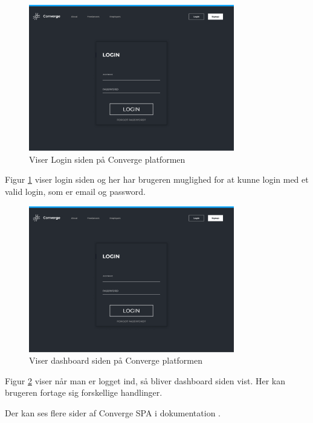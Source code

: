 \begin{figure}[H]
    \centering
  \includegraphics[width=0.8\textwidth]{Billeder/Login.pdf}
  \caption{Viser Login siden på Converge platformen}
  \label{fig:login}
  \end{figure}

Figur \ref{fig:login} viser login siden og her har brugeren muglighed for at kunne login med et valid login, som er
email og password.

\begin{figure}[H]
    \centering
  \includegraphics[width=0.8\textwidth]{Billeder/Login.pdf}
  \caption{Viser dashboard siden på Converge platformen}
  \label{fig:dashboard}
  \end{figure}

Figur \ref{fig:dashboard} viser når man er logget ind, så bliver dashboard siden vist. Her kan
brugeren fortage sig forskellige handlinger. 

Der kan ses flere sider af Converge SPA i dokumentation \cite{system-interface}.